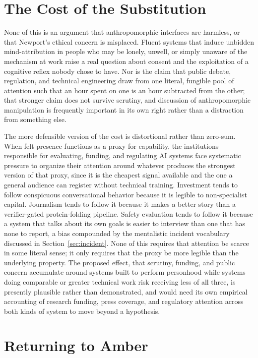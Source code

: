 \documentclass[11pt]{article}
\begin{document}
\section{The Cost of the Substitution}
\label{sec:cost}

None of this is an argument that anthropomorphic interfaces are harmless, or that Newport's ethical concern is misplaced. Fluent systems that induce unbidden mind-attribution in people who may be lonely, unwell, or simply unaware of the mechanism at work raise a real question about consent and the exploitation of a cognitive reflex nobody chose to have. Nor is the claim that public debate, regulation, and technical engineering draw from one literal, fungible pool of attention such that an hour spent on one is an hour subtracted from the other; that stronger claim does not survive scrutiny, and discussion of anthropomorphic manipulation is frequently important in its own right rather than a distraction from something else.

The more defensible version of the cost is distortional rather than zero-sum. When felt presence functions as a proxy for capability, the institutions responsible for evaluating, funding, and regulating AI systems face systematic pressure to organize their attention around whatever produces the strongest version of that proxy, since it is the cheapest signal available and the one a general audience can register without technical training. Investment tends to follow conspicuous conversational behavior because it is legible to non-specialist capital. Journalism tends to follow it because it makes a better story than a verifier-gated protein-folding pipeline. Safety evaluation tends to follow it because a system that talks about its own goals is easier to interview than one that has none to report, a bias compounded by the mentalistic incident vocabulary discussed in Section~\ref{sec:incident}. None of this requires that attention be scarce in some literal sense; it only requires that the proxy be more legible than the underlying property. The proposed effect, that scrutiny, funding, and public concern accumulate around systems built to perform personhood while systems doing comparable or greater technical work risk receiving less of all three, is presently plausible rather than demonstrated, and would need its own empirical accounting of research funding, press coverage, and regulatory attention across both kinds of system to move beyond a hypothesis.

\section{Returning to Amber}
\label{sec:conclusion}
\end{document}
